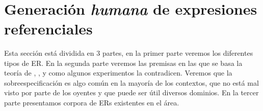 \
\section{Generaci\'on \emph{humana} de expresiones referenciales}
\label{generacion-humana}

Esta secci\'on est\'a dividida en 3 partes, en la primer parte veremos los diferentes tipos de ER. En la segunda parte veremos las premisas en las que se basa la teor\'ia de  \cite{clark1992arenas}, \cite{Clark-Marshall81}, y como algunos experimentos la contradicen. Veremos que la sobreespecificaci\'on es algo com\'un en la mayor\'ia de los contextos, que no est\'a mal visto por parte de los oyentes y que puede ser \'util diversos dominios. En la tercer parte presentamos corpora de ERs existentes en el \'area.



